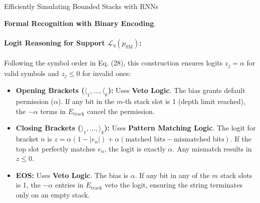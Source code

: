 \begin{question}{Efficiently Simulating Bounded Stacks with RNNs}
\begin{subquestion}{\textbf{Formal Recognition with Binary Encoding}.}
\paragraph{Logit Reasoning for Support $\mathcal{L}_{\eta}(p_{\text{SM}})$:}
Following the symbol order in Eq. (28), this construction ensures logits $z_j = \alpha$ for valid symbols and $z_j \le 0$ for invalid ones:
\begin{itemize}
    \item \textbf{Opening Brackets ($\langle_1, \dots, \langle_k$):} Uses \textbf{Veto Logic}. The bias grants default permission ($\alpha$). If any bit in the $m$-th stack slot is 1 (depth limit reached), the $-\alpha$ terms in $E_{\text{track}}$ cancel the permission.
    \item \textbf{Closing Brackets ($\rangle_1, \dots, \rangle_k$):} Uses \textbf{Pattern Matching Logic}. The logit for bracket $n$ is $z = \alpha(1 - |e_n|) + \alpha(\text{matched bits} - \text{mismatched bits})$. If the top slot perfectly matches $e_n$, the logit is exactly $\alpha$. Any mismatch results in $z \le 0$.
    \item \textbf{EOS:} Uses \textbf{Veto Logic}. The bias is $\alpha$. If any bit in any of the $m$ stack slots is 1, the $-\alpha$ entries in $E_{\text{track}}$ veto the logit, ensuring the string terminates only on an empty stack.
\end{itemize}

\end{subquestion}


\end{question}